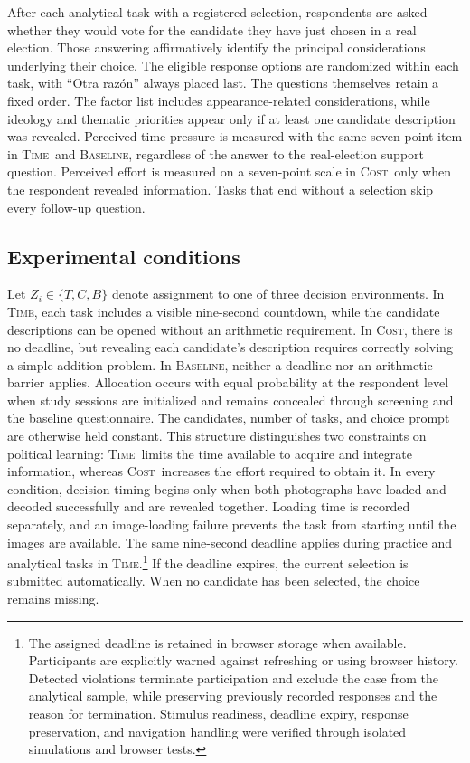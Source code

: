 \documentclass[11pt]{article}\usepackage[]{graphicx}\usepackage[]{xcolor}
\newcommand{\armT}{\textsc{Time}}
\newcommand{\armC}{\textsc{Cost}}
\newcommand{\armB}{\textsc{Baseline}}
\begin{document}
After each analytical task with a registered selection, respondents are asked whether they would vote for the candidate they have just chosen in a real election. Those answering affirmatively identify the principal considerations underlying their choice. The eligible response options are randomized within each task, with ``Otra raz\'on'' always placed last. The questions themselves retain a fixed order. The factor list includes appearance-related considerations, while ideology and thematic priorities appear only if at least one candidate description was revealed. Perceived time pressure is measured with the same seven-point item in \armT\ and \armB, regardless of the answer to the real-election support question. Perceived effort is measured on a seven-point scale in \armC\ only when the respondent revealed information. Tasks that end without a selection skip every follow-up question.

\subsection{Experimental conditions}

Let $Z_i\in\{T,C,B\}$ denote assignment to one of three decision environments. In \armT, each task includes a visible nine-second countdown, while the candidate descriptions can be opened without an arithmetic requirement. In \armC, there is no deadline, but revealing each candidate's description requires correctly solving a simple addition problem. In \armB, neither a deadline nor an arithmetic barrier applies. Allocation occurs with equal probability at the respondent level when study sessions are initialized and remains concealed through screening and the baseline questionnaire. The candidates, number of tasks, and choice prompt are otherwise held constant. This structure distinguishes two constraints on political learning: \armT\ limits the time available to acquire and integrate information, whereas \armC\ increases the effort required to obtain it. In every condition, decision timing begins only when both photographs have loaded and decoded successfully and are revealed together. Loading time is recorded separately, and an image-loading failure prevents the task from starting until the images are available. The same nine-second deadline applies during practice and analytical tasks in \armT.\footnote{The assigned deadline is retained in browser storage when available. Participants are explicitly warned against refreshing or using browser history. Detected violations terminate participation and exclude the case from the analytical sample, while preserving previously recorded responses and the reason for termination. Stimulus readiness, deadline expiry, response preservation, and navigation handling were verified through isolated simulations and browser tests.} If the deadline expires, the current selection is submitted automatically. When no candidate has been selected, the choice remains missing.
\end{document}
